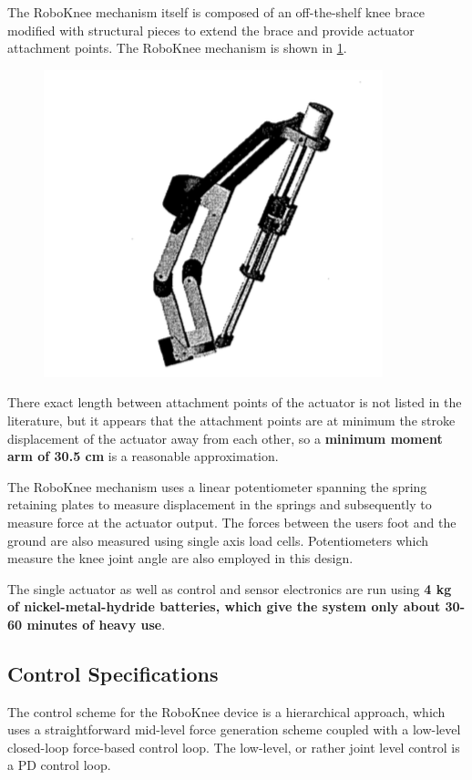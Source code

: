  The RoboKnee mechanism itself is composed of an off-the-shelf knee brace modified with structural pieces to extend the brace and provide actuator attachment points.  The RoboKnee mechanism is shown in \ref{fig:roboKnee}.  
 \begin{figure}[thpb]
\centering
\includegraphics[width=3.in]{exos/figs/roboKnee/roboBrace}
  \caption{}
  \vspace{-0.2in}
 \label{fig:roboKnee}   
 \end{figure}
 There exact length between attachment points of the actuator is not listed in the literature, but it appears that the attachment points are at minimum the stroke displacement of the actuator  away from each other, so a {\bf minimum moment arm of 30.5 cm} is a reasonable approximation.
 
 The RoboKnee mechanism uses a linear potentiometer spanning the spring retaining plates to measure displacement in the springs and subsequently to measure force at the actuator output.  The forces between the users foot and the ground are also measured using single axis load cells.  Potentiometers which measure the knee joint angle are also employed in this design.     
 
 The single actuator as well as control and sensor electronics are run using {\bf 4 kg of nickel-metal-hydride batteries, which give the system only about 30-60 minutes of heavy use}.
 
 
 \subsection{Control Specifications}
 
 The control scheme for the RoboKnee device is a hierarchical approach, which uses a straightforward mid-level force generation scheme coupled with a low-level closed-loop force-based control loop.  The low-level, or rather joint level control is a PD control loop.
 
